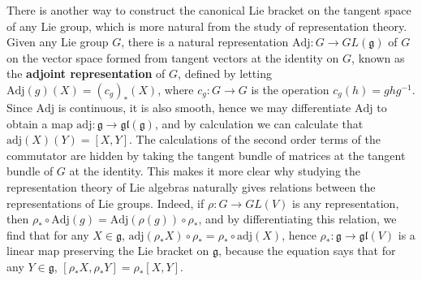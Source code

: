 There is another way to construct the canonical Lie bracket on the tangent space of any Lie group, which is more natural from the study of representation theory. Given any Lie group $G$, there is a natural representation $\text{Adj}: G \to GL(\mathfrak{g})$ of $G$ on the vector space formed from tangent vectors at the identity on $G$, known as the {\bf adjoint representation} of $G$, defined by letting $\text{Adj}(g)(X) = (c_g)_*(X)$, where $c_g: G \to G$ is the operation $c_g(h) = ghg^{-1}$. Since $\text{Adj}$ is continuous, it is also smooth, hence we may differentiate $\text{Adj}$ to obtain a map $\text{adj}: \mathfrak{g} \to \mathfrak{gl}(\mathfrak{g})$, and by calculation we can calculate that $\text{adj}(X)(Y) = [X,Y]$. The calculations of the second order terms of the commutator are hidden by taking the tangent bundle of matrices at the tangent bundle of $G$ at the identity. This makes it more clear why studying the representation theory of Lie algebras naturally gives relations between the representations of Lie groups. Indeed, if $\rho: G \to GL(V)$ is any representation, then $\rho_* \circ \text{Adj}(g) = \text{Adj}(\rho(g)) \circ \rho_*$, and by differentiating this relation, we find that for any $X \in \mathfrak{g}$, $\text{adj}(\rho_* X) \circ \rho_* = \rho_* \circ \text{adj}(X)$, hence $\rho_*: \mathfrak{g} \to \mathfrak{gl}(V)$ is a linear map preserving the Lie bracket on $\mathfrak{g}$, because the equation says that for any $Y \in \mathfrak{g}$, $[\rho_* X, \rho_* Y] = \rho_*[X,Y]$.

